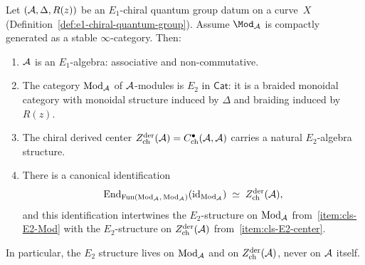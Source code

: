 \begin{theorem}%
\label{thm:categorical-level-shift}%
%
%
%
Let $(\mathcal{A}, \Delta, R(z))$ be an $E_1$-chiral quantum group datum on
a curve~$X$
\textup{(}Definition~\textup{\ref{def:e1-chiral-quantum-group}}\textup{)}.
Assume $\Mod_\cA$ is compactly generated as a stable
$\infty$-category. Then:
\begin{enumerate}[label=\textup{(\roman*)}]
\item\label{item:cls-E1}
$\mathcal{A}$ is an $E_1$-algebra: associative and non-commutative.
\item\label{item:cls-E2-Mod}
The category $\mathrm{Mod}_{\mathcal{A}}$ of $\mathcal{A}$-modules is
$E_2$ in $\mathsf{Cat}$: it is a braided monoidal category
with monoidal structure induced by $\Delta$ and braiding
induced by $R(z)$.
\item\label{item:cls-E2-center}
The chiral derived center
$Z^{\mathrm{der}}_{\mathrm{ch}}(\mathcal{A})
= C^\bullet_{\mathrm{ch}}(\mathcal{A}, \mathcal{A})$
carries a natural $E_2$-algebra structure.
\item\label{item:cls-identification}
There is a canonical identification
\begin{equation}\label{eq:center-end-identification}
\mathrm{End}_{\mathrm{Fun}(\mathrm{Mod}_{\mathcal{A}},\,
\mathrm{Mod}_{\mathcal{A}})}(\mathrm{id}_{\mathrm{Mod}_{\mathcal{A}}})
\;\simeq\;
Z^{\mathrm{der}}_{\mathrm{ch}}(\mathcal{A}),
\end{equation}
and this identification intertwines the $E_2$-structure on
$\mathrm{Mod}_{\mathcal{A}}$ from~\ref{item:cls-E2-Mod} with the
$E_2$-structure on
$Z^{\mathrm{der}}_{\mathrm{ch}}(\mathcal{A})$
from~\ref{item:cls-E2-center}.
\end{enumerate}
In particular, the $E_2$ structure lives on
$\mathrm{Mod}_{\mathcal{A}}$ and on $Z^{\mathrm{der}}_{\mathrm{ch}}(\mathcal{A})$,
never on $\mathcal{A}$ itself.
\end{theorem}

